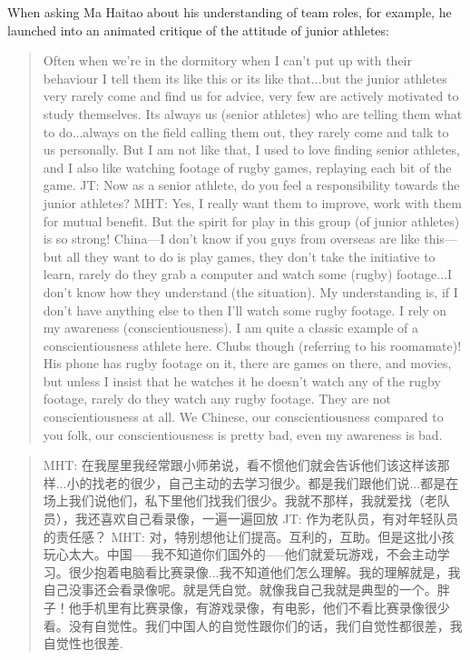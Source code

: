 \begin{CJK}{UTF8}{gbsn}
When asking Ma Haitao about his understanding of team roles, for example, he launched into an animated critique of the attitude of junior athletes:


  \begin{quotation}
    Often when we're in the dormitory when I can't put up with their behaviour I tell them its like this or its like that...but the junior athletes very rarely come and find us for advice, very few are actively motivated to study themselves. Its always us (senior athletes) who are telling them what to do...always on the field calling them out, they rarely come and talk to us personally.  But I am not like that, I used to love finding senior athletes, and I also like watching footage of rugby games, replaying each bit of the game.
    JT: Now as a senior athlete, do you feel a responsibility towards the junior athletes?
    MHT: Yes, I really want them to improve, work with them for mutual benefit.  But the spirit for play in this group (of junior athletes) is so strong!  China---I don't know if you guys from overseas are like this---but all they want to do is play games, they don't take the initiative to learn, rarely do they grab a computer and watch some (rugby) footage...I don’t know how they understand (the situation).  My understanding is, if I don’t have anything else to then I’ll watch some rugby footage. I rely on my awareness (conscientiousness).  I am quite a classic example of a conscientiousness athlete here.  Chubs though (referring to his roomamate)!  His phone has rugby footage on it, there are games on there, and movies, but unless I insist that he watches it he doesn't watch any of the rugby footage, rarely do they watch any rugby footage.  They are not conscientiousness at all. We Chinese, our conscientiousness compared to you folk, our conscientiousness is pretty bad, even my awareness is bad.
  \end{quotation}

  \begin{quotation}
    MHT: 在我屋里我经常跟小师弟说，看不惯他们就会告诉他们该这样该那样...小的找老的很少，自己主动的去学习很少。都是我们跟他们说...都是在场上我们说他们，私下里他们找我们很少。我就不那样，我就爱找（老队员），我还喜欢自己看录像，一遍一遍回放
    JT: 作为老队员，有对年轻队员的责任感？
    MHT: 对，特别想他让们提高。互利的，互助。但是这批小孩玩心太大。中国—--我不知道你们国外的—--他们就爱玩游戏，不会主动学习。很少抱着电脑看比赛录像...我不知道他们怎么理解。我的理解就是，我自己没事还会看录像呢。就是凭自觉。就像我自己我就是典型的一个。胖子！他手机里有比赛录像，有游戏录像，有电影，他们不看比赛录像很少看。没有自觉性。我们中国人的自觉性跟你们的话，我们自觉性都很差，我自觉性也很差.
  \end{quotation}




\end{CJK}
